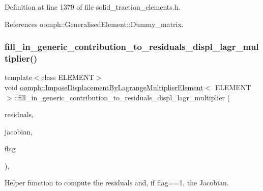 Definition at line 1379 of file solid\+\_\+traction\+\_\+elements.\+h.



References oomph\+::\+Generalised\+Element\+::\+Dummy\+\_\+matrix.

\mbox{\label{classoomph_1_1ImposeDisplacementByLagrangeMultiplierElement_af57cab6b68c332061086aae5e8c393b3}} 
\subsubsection{\texorpdfstring{fill\+\_\+in\+\_\+generic\+\_\+contribution\+\_\+to\+\_\+residuals\+\_\+displ\+\_\+lagr\+\_\+multiplier()}{fill\_in\_generic\_contribution\_to\_residuals\_displ\_lagr\_multiplier()}}
{\footnotesize\ttfamily template$<$class E\+L\+E\+M\+E\+NT$>$ \\
void \hyperlink{classoomph_1_1ImposeDisplacementByLagrangeMultiplierElement}{oomph\+::\+Impose\+Displacement\+By\+Lagrange\+Multiplier\+Element}$<$ E\+L\+E\+M\+E\+NT $>$\+::fill\+\_\+in\+\_\+generic\+\_\+contribution\+\_\+to\+\_\+residuals\+\_\+displ\+\_\+lagr\+\_\+multiplier (\begin{DoxyParamCaption}\item[{\hyperlink{classoomph_1_1Vector}{Vector}$<$ double $>$ \&}]{residuals,  }\item[{\hyperlink{classoomph_1_1DenseMatrix}{Dense\+Matrix}$<$ double $>$ \&}]{jacobian,  }\item[{const unsigned \&}]{flag }\end{DoxyParamCaption})\hspace{0.3cm}{\ttfamily [inline]}, {\ttfamily [protected]}}



Helper function to compute the residuals and, if flag==1, the Jacobian. 



